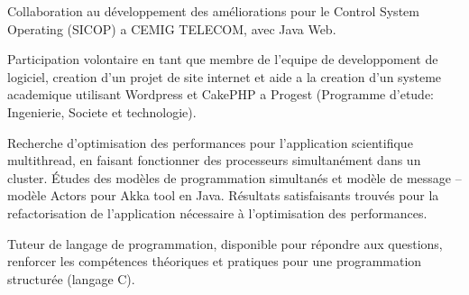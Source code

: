 \documentclass[9pt,a4paper]{altacv}
\begin{document}
\divider


Collaboration au développement des améliorations pour le Control System Operating (SICOP) a CEMIG TELECOM, avec Java Web.

\divider


Participation volontaire en tant que membre de l'equipe de developpoment de logiciel, creation d'un projet de site internet et aide a la creation d'un systeme academique utilisant Wordpress et CakePHP a Progest (Programme d'etude: Ingenierie, Societe et technologie).

\divider


Recherche d'optimisation des performances pour l'application scientifique multithread, en faisant fonctionner des processeurs simultanément dans un cluster. Études des modèles de programmation simultanés et modèle de message – modèle Actors pour Akka tool en Java. Résultats satisfaisants trouvés pour la refactorisation de l'application nécessaire à l'optimisation des performances.

\divider


Tuteur de langage de programmation, disponible pour répondre aux questions, renforcer les compétences théoriques et pratiques pour une programmation structurée (langage C).




\clearpage

\end{document}

